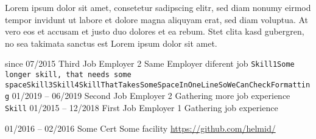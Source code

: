 \documentclass[9pt]{developercv} %
\begin{document}
                                \begin{minipage}[t]{0.4\textwidth} 
                	\vspace{-\baselineskip} %
                	Lorem ipsum dolor sit amet, consetetur sadipscing elitr, sed diam nonumy eirmod tempor invidunt ut labore et dolore magna aliquyam erat, sed diam voluptua. At vero eos et accusam et justo duo dolores et ea rebum. Stet clita kasd gubergren, no sea takimata sanctus est Lorem ipsum dolor sit amet.
                \end{minipage}
                                \hfill %
                \begin{minipage}[t]{0.5\textwidth} 
                	\vspace{-\baselineskip} %
                	                \begin{barchart}{5.5}
                \end{barchart}
                    \vspace{0.5cm}
                \end{minipage}

                \begin{entrylist}
                	\entry
    {since 07/2015}
    {Third Job}
    {Employer 2}
    {Same Employer diferent job
    \newline \texttt{Skill1}\slashsep\texttt{Some longer skill, that needs some space}\slashsep\texttt{Skill3}\slashsep\texttt{Skill4}\slashsep\texttt{SkillThatTakesSomeSpaceInOneLineSoWeCanCheckFormatting}}
\entry
    {01/2019 -- 06/2019}
    {Second Job}
    {Employer 2}
    {Gathering more job experience
    \newline \texttt{Skill}}
\entry
    {01/2015 -- 12/2018}
    {First Job}
    {Employer 1}
    {Gathering job experience
    }
                \end{entrylist}
                   
               \begin{entrylist}
                   \entry
{01/2016 -- 02/2016}
{Some Cert}
{Some facility}
{\href{https://github.com/helmid/}{https://github.com/helmid/}}
               \end{entrylist}
                    
\end{document}
